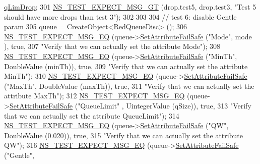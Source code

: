 \begin{DoxyCode}
      \hyperlink{structns3_1_1RedQueueDisc_1_1Stats_a2374b8b8386ad6e42435bf1b29109bad}{qLimDrop};
301   \hyperlink{group__testing_ga6ba43672d44c1e85acfb1daf2af66612}{NS\_TEST\_EXPECT\_MSG\_GT} (drop.test5, drop.test3, \textcolor{stringliteral}{"Test 5 should have more drops than
       test 3"});
302 
303 
304   \textcolor{comment}{// test 6: disable Gentle param}
305   queue = CreateObject<RedQueueDisc> ();
306   \hyperlink{group__testing_ga7304ba46a28d8cf08dfdfd6499cf7068}{NS\_TEST\_EXPECT\_MSG\_EQ} (queue->\hyperlink{classns3_1_1ObjectBase_aa7d333004e970f925a4ed5df275541b5}{SetAttributeFailSafe} (\textcolor{stringliteral}{"Mode"}, mode
      ), \textcolor{keyword}{true},
307                          \textcolor{stringliteral}{"Verify that we can actually set the attribute Mode"});
308   \hyperlink{group__testing_ga7304ba46a28d8cf08dfdfd6499cf7068}{NS\_TEST\_EXPECT\_MSG\_EQ} (queue->\hyperlink{classns3_1_1ObjectBase_aa7d333004e970f925a4ed5df275541b5}{SetAttributeFailSafe} (\textcolor{stringliteral}{"MinTh"}, 
      DoubleValue (minTh)), \textcolor{keyword}{true},
309                          \textcolor{stringliteral}{"Verify that we can actually set the attribute MinTh"});
310   \hyperlink{group__testing_ga7304ba46a28d8cf08dfdfd6499cf7068}{NS\_TEST\_EXPECT\_MSG\_EQ} (queue->\hyperlink{classns3_1_1ObjectBase_aa7d333004e970f925a4ed5df275541b5}{SetAttributeFailSafe} (\textcolor{stringliteral}{"MaxTh"}, 
      DoubleValue (maxTh)), \textcolor{keyword}{true},
311                          \textcolor{stringliteral}{"Verify that we can actually set the attribute MaxTh"});
312   \hyperlink{group__testing_ga7304ba46a28d8cf08dfdfd6499cf7068}{NS\_TEST\_EXPECT\_MSG\_EQ} (queue->\hyperlink{classns3_1_1ObjectBase_aa7d333004e970f925a4ed5df275541b5}{SetAttributeFailSafe} (\textcolor{stringliteral}{"QueueLimit"}
      , UintegerValue (qSize)), \textcolor{keyword}{true},
313                          \textcolor{stringliteral}{"Verify that we can actually set the attribute QueueLimit"});
314   \hyperlink{group__testing_ga7304ba46a28d8cf08dfdfd6499cf7068}{NS\_TEST\_EXPECT\_MSG\_EQ} (queue->\hyperlink{classns3_1_1ObjectBase_aa7d333004e970f925a4ed5df275541b5}{SetAttributeFailSafe} (\textcolor{stringliteral}{"QW"}, 
      DoubleValue (0.020)), \textcolor{keyword}{true},
315                          \textcolor{stringliteral}{"Verify that we can actually set the attribute QW"});
316   \hyperlink{group__testing_ga7304ba46a28d8cf08dfdfd6499cf7068}{NS\_TEST\_EXPECT\_MSG\_EQ} (queue->\hyperlink{classns3_1_1ObjectBase_aa7d333004e970f925a4ed5df275541b5}{SetAttributeFailSafe} (\textcolor{stringliteral}{"Gentle"}, 

\end{DoxyCode}
